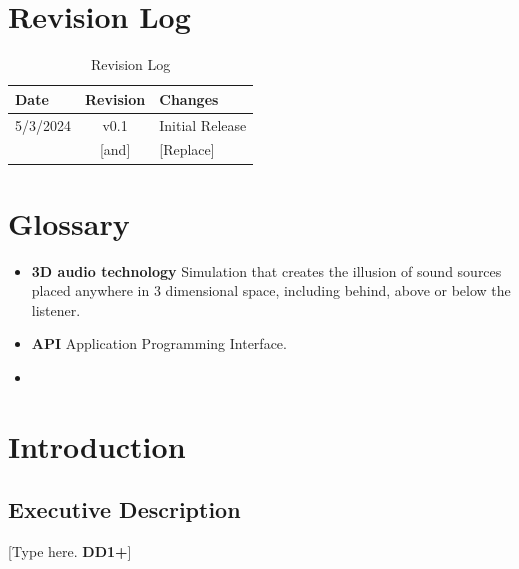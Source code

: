 \documentclass[letterpaper, 11pt]{article}
\begin{document}
\clearpage
\listoffigures %

\clearpage
\listoftables %

\clearpage
\section*{Revision Log}
\begin{table}[h]
    \begin{tabularx}{\textwidth}{|l|c|X|} %
        \hline
        Date     & Revision & Changes         \\ \hline
        5/3/2024 & v0.1     & Initial Release \\ \hline
        [Copy]   & [and]    & [Replace]       \\ \hline
    \end{tabularx}
    \caption{Revision Log}
\end{table}

\clearpage
\section*{Glossary} %
\begin{itemize} %
    \item \textbf{3D audio technology} Simulation that creates the illusion of sound sources placed anywhere in 3 dimensional space, including behind, above or below the listener.
    \item \textbf{API} Application Programming Interface.
    \item
\end{itemize}

\clearpage
\section{Introduction}
\subsection{Executive Description}
[Type here. \textbf{DD1+}]
\end{document}
